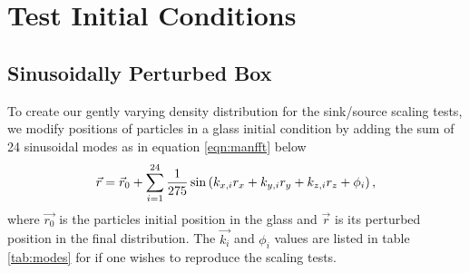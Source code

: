 \documentclass[fleq,usenatbib]{mnras}
\begin{document}
\appendix
\section{Test Initial Conditions}\label{sec:icnd}
\subsection{Sinusoidally Perturbed Box}
To create our gently varying density distribution for the sink/source scaling 
tests, we modify positions of particles in a glass initial condition by adding 
the sum of 24 sinusoidal modes as in equation \ref{eqn:manfft} below
\begin{equation}\label{eqn:manfft}
\vec{r} = \vec{r}_{\rm 0} + \sum_{i=1}^{24} \frac{1}{275} \sin 
\left( k_{x,i} r_x + k_{y,i} r_y + k_{z,i} r_z + \phi_i\right),
\end{equation}
where $\vec{r_0}$ is the particles initial position in the glass and $\vec{r}$ 
is its perturbed position in the final distribution. The $\vec{k_i}$ and 
$\phi_i$ values are listed in table \ref{tab:modes} for if one wishes to 
reproduce the scaling tests.  
\end{document}
